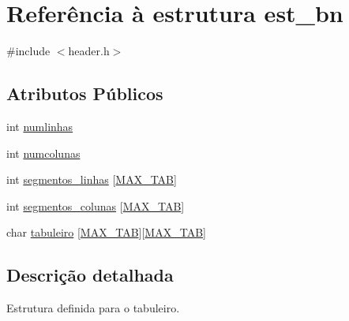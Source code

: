 \hypertarget{structest__bn}{\section{Referência à estrutura est\-\_\-bn}
\label{structest__bn}
}


{\ttfamily \#include $<$header.\-h$>$}

\subsection*{Atributos Públicos}
\begin{DoxyCompactItemize}
\item 
int \hyperlink{structest__bn_af15be3a2b8dd97b2f754471aa655dc6f}{numlinhas}
\item 
int \hyperlink{structest__bn_a0955bffd5d0a13407e1bb2657c296a24}{numcolunas}
\item 
int \hyperlink{structest__bn_a08d8030c339bf47ead4990d55b03be3f}{segmentos\-\_\-linhas} \mbox{[}\hyperlink{header_8h_a7dd3447b4515b0ecec421b5a18ff8e97}{M\-A\-X\-\_\-\-T\-A\-B}\mbox{]}
\item 
int \hyperlink{structest__bn_a265ad1c59b326360f2f973a120f21327}{segmentos\-\_\-colunas} \mbox{[}\hyperlink{header_8h_a7dd3447b4515b0ecec421b5a18ff8e97}{M\-A\-X\-\_\-\-T\-A\-B}\mbox{]}
\item 
char \hyperlink{structest__bn_a99b2239f6adcd4c4e268639bb1041d5a}{tabuleiro} \mbox{[}\hyperlink{header_8h_a7dd3447b4515b0ecec421b5a18ff8e97}{M\-A\-X\-\_\-\-T\-A\-B}\mbox{]}\mbox{[}\hyperlink{header_8h_a7dd3447b4515b0ecec421b5a18ff8e97}{M\-A\-X\-\_\-\-T\-A\-B}\mbox{]}
\end{DoxyCompactItemize}


\subsection{Descrição detalhada}
Estrutura definida para o tabuleiro. 


